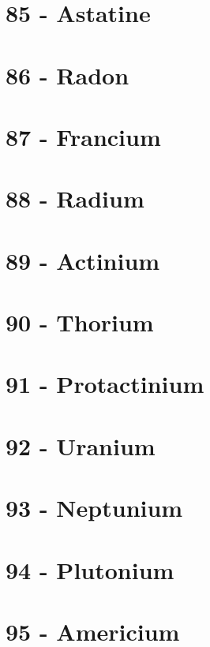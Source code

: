\documentclass{book}
\begin{document}
\section{85 - Astatine}
\label{sec:elem-astatine}

\section{86 - Radon}
\label{sec:elem-radon}

\section{87 - Francium}
\label{sec:elem-francium}

\section{88 - Radium}
\label{sec:elem-radium}

\section{89 - Actinium}
\label{sec:elem-actinium}

\section{90 - Thorium}
\label{sec:elem-thorium}

\section{91 - Protactinium}
\label{sec:elem-protactinium}

\section{92 - Uranium}
\label{sec:elem-uranium}

\section{93 - Neptunium}
\label{sec:elem-neptunium}

\section{94 - Plutonium}
\label{sec:elem-plutonium}

\section{95 - Americium}
\label{sec:elem-americium}
\end{document}
